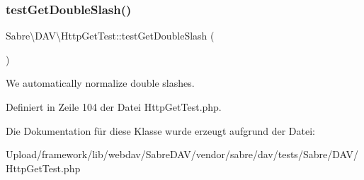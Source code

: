 \subsubsection{\texorpdfstring{test\+Get\+Double\+Slash()}{testGetDoubleSlash()}}
{\footnotesize\ttfamily Sabre\textbackslash{}\+D\+A\+V\textbackslash{}\+Http\+Get\+Test\+::test\+Get\+Double\+Slash (\begin{DoxyParamCaption}{ }\end{DoxyParamCaption})}

We automatically normalize double slashes. 

Definiert in Zeile 104 der Datei Http\+Get\+Test.\+php.



Die Dokumentation für diese Klasse wurde erzeugt aufgrund der Datei\+:\begin{DoxyCompactItemize}
\item 
Upload/framework/lib/webdav/\+Sabre\+D\+A\+V/vendor/sabre/dav/tests/\+Sabre/\+D\+A\+V/Http\+Get\+Test.\+php\end{DoxyCompactItemize}
